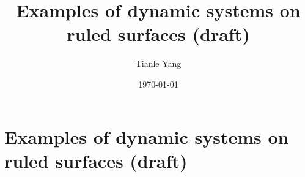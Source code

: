 \documentclass{noteformyself}
\title{Examples of dynamic systems on ruled surfaces (draft)}
\author{Tianle Yang}
\date{\today}
\begin{document}
    \maketitle


    \section{Examples of dynamic systems on ruled surfaces (draft)}


    \printbibliography[heading=bibintoc, title={References}] %
\end{document}
